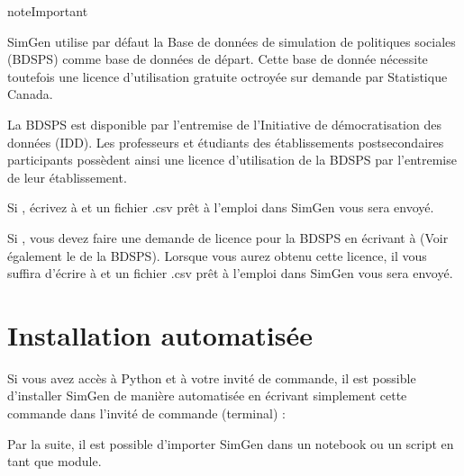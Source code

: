 \documentclass[letterpaper,10pt,french]{sphinxmanual}
\begin{document}
\begin{sphinxadmonition}{note}{Important}

SimGen utilise par défaut la Base de données de simulation de politiques sociales (BDSPS)
comme base de données de départ. Cette base de donnée nécessite toutefois une licence d’utilisation gratuite octroyée sur demande par Statistique Canada.

La BDSPS est disponible par l’entremise de l’Initiative
de démocratisation des données (IDD). Les professeurs et étudiants des établissements
postsecondaires participants possèdent ainsi une licence d’utilisation de la BDSPS par l’entremise
de leur établissement.

Si ,
écrivez à  et un fichier .csv prêt à l’emploi
dans SimGen vous sera envoyé.

Si , vous devez faire une demande de licence pour la BDSPS
en écrivant à  (Voir également le  de la BDSPS). Lorsque vous aurez obtenu
cette licence, il vous suffira d’écrire à  et
un fichier .csv prêt à l’emploi dans SimGen vous sera envoyé.
\end{sphinxadmonition}


\section{Installation automatisée}
\label{\detokenize{installation:installation-automatisee}}
Si vous avez accès à Python et à votre invité de commande, il est possible d’installer SimGen
de manière automatisée en écrivant simplement cette commande dans l’invité de commande (terminal) :

\begin{sphinxVerbatim}[commandchars=\\\{\}]
  
\end{sphinxVerbatim}

Par la suite, il est possible d’importer SimGen dans un notebook ou un script en tant que module.

\begin{sphinxVerbatim}[commandchars=\\\{\}]
 
\end{sphinxVerbatim}
\end{document}
